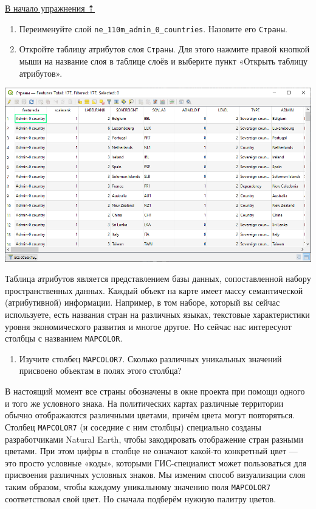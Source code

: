\documentclass[
  12pt,
]{book}
\providecommand{\tightlist}{%
  \setlength{\itemsep}{0pt}\setlength{\parskip}{0pt}}
\begin{document}
\protect\hyperlink{map-design-world}{В начало упражнения ⇡}

\begin{enumerate}
\def\labelenumi{\arabic{enumi}.}
\item
  Переименуйте слой \texttt{ne\_110m\_admin\_0\_countries}. Назовите его \texttt{Страны}.
\item
  Откройте таблицу атрибутов слоя \texttt{Страны}. Для этого нажмите правой кнопкой мыши на название слоя в таблице слоёв и выберите пункт «Открыть таблицу атрибутов».
\end{enumerate}

\includegraphics{images/Ex01_WorldMap/attributetable.png}

Таблица атрибутов является представлением базы данных, сопоставленной набору пространственных данных. Каждый объект на карте имеет массу семантической (атрибутивной) информации. Например, в том наборе, который вы сейчас используете, есть названия стран на различных языках, текстовые характеристики уровня экономического развития и многое другое. Но сейчас нас интересуют столбцы с названием \texttt{MAPCOLOR}.

\begin{enumerate}
\def\labelenumi{\arabic{enumi}.}
\tightlist
\item
  Изучите столбец \texttt{MAPCOLOR7}. Сколько различных уникальных значений присвоено объектам в полях этого столбца?
\end{enumerate}

В настоящий момент все страны обозначены в окне проекта при помощи одного и того же условного знака. На политических картах различные территории обычно отображаются различными цветами, причём цвета могут повторяться. Столбец \texttt{MAPCOLOR7} (и соседние с ним столбцы) специально созданы разработчиками Natural Earth, чтобы закодировать отображение стран разными цветами. При этом цифры в столбце не означают какой-то конкретный цвет --- это просто условные «коды», которыми ГИС-специалист может пользоваться для присвоения различных условных знаков. Мы изменим способ визуализации слоя таким образом, чтобы каждому уникальному значению поля \texttt{MAPCOLOR7} соответствовал свой цвет. Но сначала подберём нужную палитру цветов.
\end{document}
